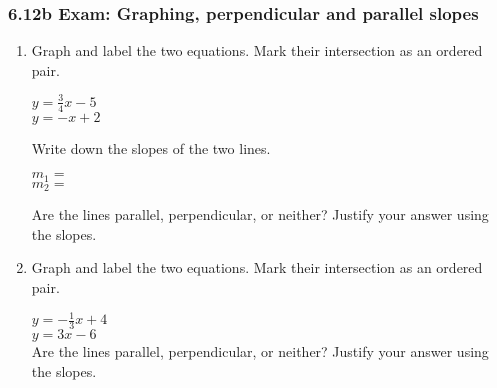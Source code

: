 \documentclass[12pt, twoside]{article}
\begin{document}
\subsubsection*{6.12b Exam: Graphing, perpendicular and parallel slopes}
  \begin{enumerate}

  \item Graph and label the two equations. Mark their intersection as an ordered pair.
    \begin{multicols}{2}
      $y =\frac{3}{4}x-5$ \\
      $y=-x+2$
    \end{multicols}     \vspace{0.1cm}
    Write down the slopes of the two lines.
    \begin{multicols}{2}
      $m_1=$ \\
      $m_2=$
    \end{multicols}     \vspace{0.1cm}
    Are the lines parallel, perpendicular, or neither? Justify your answer using the slopes.
    \vspace{3cm}
    \begin{center}
    \end{center}

\newpage
  \item Graph and label the two equations. Mark their intersection as an ordered pair.
      \begin{multicols}{2}
        $y =-\frac{1}{3}x+4$ \\[0.25cm]
        $y=3x-6$ \\
        Are the lines parallel, perpendicular, or neither? Justify your answer using the slopes.
      \end{multicols}     \vspace{0.1cm}
      \vspace{1cm}
      \begin{flushright} %
      \end{flushright}


\end{enumerate}
\end{document}
